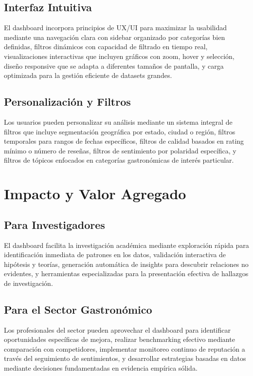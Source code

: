 \documentclass[12pt,a4paper,twoside,openany]{book}
\begin{document}
\subsection{Interfaz Intuitiva}

El dashboard incorpora principios de UX/UI para maximizar la usabilidad mediante una navegación clara con sidebar organizado por categorías bien definidas, filtros dinámicos con capacidad de filtrado en tiempo real, visualizaciones interactivas que incluyen gráficos con zoom, hover y selección, diseño responsive que se adapta a diferentes tamaños de pantalla, y carga optimizada para la gestión eficiente de datasets grandes.

\subsection{Personalización y Filtros}

Los usuarios pueden personalizar su análisis mediante un sistema integral de filtros que incluye segmentación geográfica por estado, ciudad o región, filtros temporales para rangos de fechas específicos, filtros de calidad basados en rating mínimo o número de reseñas, filtros de sentimiento por polaridad específica, y filtros de tópicos enfocados en categorías gastronómicas de interés particular.

\section{Impacto y Valor Agregado}

\subsection{Para Investigadores}

El dashboard facilita la investigación académica mediante exploración rápida para identificación inmediata de patrones en los datos, validación interactiva de hipótesis y teorías, generación automática de insights para descubrir relaciones no evidentes, y herramientas especializadas para la presentación efectiva de hallazgos de investigación.

\subsection{Para el Sector Gastronómico}

Los profesionales del sector pueden aprovechar el dashboard para identificar oportunidades específicas de mejora, realizar benchmarking efectivo mediante comparación con competidores, implementar monitoreo continuo de reputación a través del seguimiento de sentimientos, y desarrollar estrategias basadas en datos mediante decisiones fundamentadas en evidencia empírica sólida.
\end{document}

